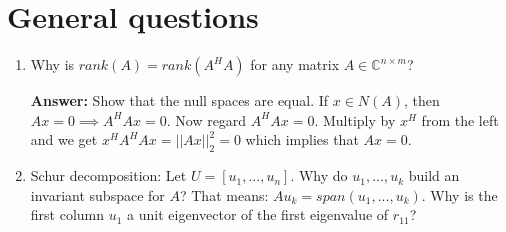 \documentclass[a4paper, landscape,twocolumn,fontsize=9pt]{scrartcl}
\begin{document}
\section*{General questions}
\begin{enumerate}
	\item Why is $rank(A) = rank(A^HA)$ for any matrix $A \in \mathbb C^{n \times m}$?

	\textbf{Answer:} Show that the null spaces are equal. If $x \in N(A)$, then $Ax = 0 \implies A^HAx = 0$. Now regard $A^HAx = 0$. Multiply by $x^H$ from the left and we get $x^HA^HAx = || Ax ||^2_2 = 0$ which implies that $Ax = 0$.
	
	\item Schur decomposition: Let $U = [u_1,...,u_n]$. Why do $u_1,...,u_k$ build an invariant subspace for $A$? That means: $Au_k = span (u_1,...,u_k)$. Why is the first column $u_1$ a unit eigenvector of the first eigenvalue of $r_{11}$?
\end{enumerate}
\end{document}
